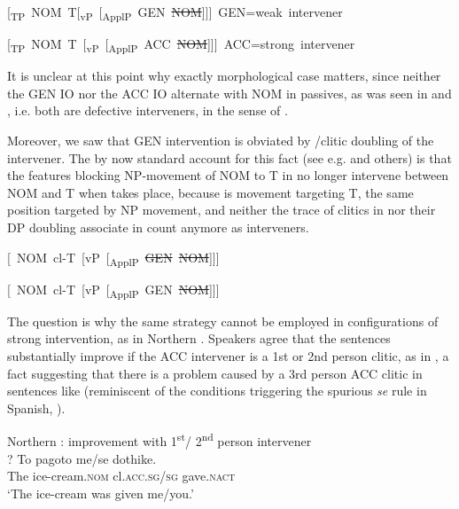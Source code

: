 \documentclass[output=paper]{LSP/langsci}
\begin{document}
\ea\label{ex:anagnost:19}
\ea\label{ex:anagnost:19a}
\mbox{[\textsubscript{TP}   NOM   T[\textsubscript{vP} [\textsubscript{ApplP} GEN \sout{NOM}]]]   GEN=weak intervener }

\ex\label{ex:anagnost:19b}
\mbox{[\textsubscript{TP}   NOM  T [\textsubscript{vP} [\textsubscript{ApplP} ACC \sout{NOM}]]]  ACC=strong intervener}
\z
\z

It is unclear at this point why exactly morphological case matters, since neither the GEN IO nor the ACC IO alternate with NOM in passives, as was seen in  and , i.e. both are defective interveners, in the sense of \citet{Chomsky2000}. 

Moreover, we saw that GEN intervention is obviated by /clitic doubling of the intervener. The by now standard account for this fact (see e.g. \citealt{Anagnostopoulou2003,Preminger2009} and others) is that the features blocking NP-movement of NOM to T in  no longer intervene between NOM and T when  takes place, because  is movement targeting T, the same position targeted by NP movement, and neither the trace of clitics in  nor their DP doubling associate in  count anymore as interveners. 



\ea\label{ex:anagnost:20}
\ea\label{ex:anagnost:20a}
\mbox{[   NOM  cl{}-T  [vP  [\textsubscript{ApplP}  \sout{GEN} \sout{NOM}]]]}

\ex\label{ex:anagnost:20b} 
\mbox{[   NOM  cl{}-T  [vP  [\textsubscript{ApplP}  GEN \sout{NOM}]]]}
\z
\z

The question is why the same strategy cannot be employed in configurations of strong intervention, as in Northern  . Speakers agree that the sentences substantially improve if the ACC intervener is a 1st or 2nd person clitic, as in , a fact suggesting that there is a problem caused by a 3rd person ACC clitic in sentences like  (reminiscent of the conditions triggering the spurious \textit{se} rule in Spanish, \citealt{Bonet1991}). 

\ea%
    \label{ex:anagnost:21}
  	  Northern : improvement with 1\textsuperscript{st}/ 2\textsuperscript{nd} person intervener\\
\gll ? To pagoto me/se dothike.  \\
{} The ice-cream.\textsc{nom}  cl.\textsc{acc.sg/sg} gave.\textsc{nact}\\
\glt 
‘The ice-cream was given me/you.’
\z
\end{document}
